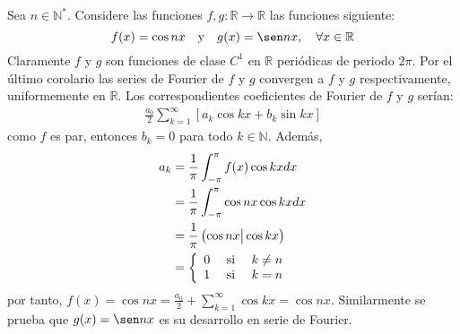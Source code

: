 \documentclass[12pt]{report}
\newcounter{it}
\theoremstyle{largebreak}
\newcommand\cf[3]{\ensuremath{#1:#2\rightarrow#3}}
\newcommand\pint[2]{\ensuremath{\left(#1\big| #2\right)}}
\begin{document}
    \begin{exa}
        Sea $n\in\mathbb{N}^*$. Considere las funciones $\cf{f,g}{\mathbb{R}}{\mathbb{R}}$ las funciones siguiente:
        \begin{equation*}
            f(x)=\cos nx\quad\textup{y}\quad g(x)=\sen nx,\quad\forall x\in\mathbb{R}
        \end{equation*}
        Claramente $f$ y $g$ son funciones de clase $C^1$ en $\mathbb{R}$ periódicas de periodo $2\pi$. Por el último corolario las series de Fourier de $f$ y $g$ convergen a $f$ y $g$ respectivamente, uniformemente en $\mathbb{R}$. Los correspondientes coeficientes de Fourier de $f$ y $g$ serían:
        \begin{equation*}
            \begin{split}
                \frac{a_0}{2}\sum_{ k=1}^\infty\left[a_k\cos kx+b_k\sin kx \right]
            \end{split}
        \end{equation*}
        como $f$ es par, entonces $b_k=0$ para todo $k\in\mathbb{N}$. Además,
        \begin{equation*}
            \begin{split}
                a_k&=\frac{1}{\pi}\int_{-\pi}^{\pi}f(x)\cos kxdx\\
                &=\frac{1}{\pi}\int_{-\pi}^{\pi}\cos nx \cos kxdx\\
                &=\frac{1}{\pi}\pint{\cos nx}{\cos kx}\\
                &=\left\{
                    \begin{array}{lcr}
                       0 & \textup{ si } & k\neq n\\
                       1 & \textup{ si } & k=n\\ 
                    \end{array}
                \right. \\
            \end{split}
        \end{equation*}
        por tanto, $f(x)=\cos nx=\frac{a_0}{2}+\sum_{ k=1}^\infty \cos kx=\cos nx$. Similarmente se prueba que $g(x)=\sen nx$ es su desarrollo en serie de Fourier.
    \end{exa}
\end{document}

